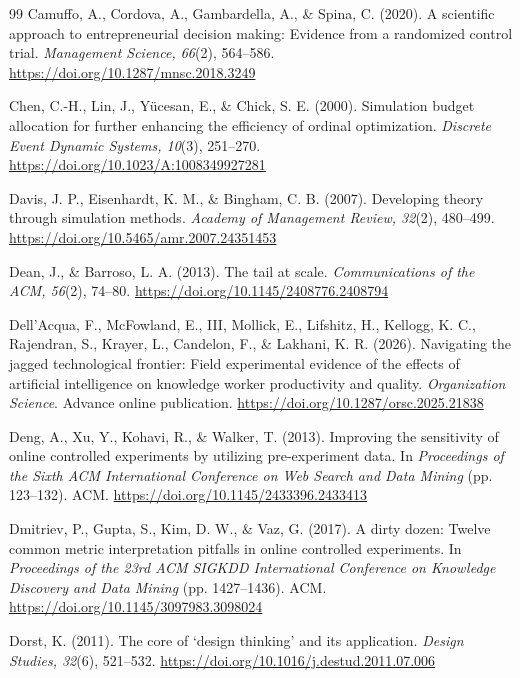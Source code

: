 \documentclass[preprint,12pt,authoryear]{elsarticle}
\providecommand{\doi}[1]{\url{https://doi.org/#1}}
\theoremstyle{definition}
\begin{document}
\begin{thebibliography}{99}
 Camuffo, A., Cordova, A., Gambardella, A., \& Spina, C. (2020). A scientific approach to entrepreneurial decision making: Evidence from a randomized control trial. \textit{Management Science, 66}(2), 564--586. \doi{10.1287/mnsc.2018.3249}

 Chen, C.-H., Lin, J., Y{\"u}cesan, E., \& Chick, S. E. (2000). Simulation budget allocation for further enhancing the efficiency of ordinal optimization. \textit{Discrete Event Dynamic Systems, 10}(3), 251--270. \doi{10.1023/A:1008349927281}

 Davis, J. P., Eisenhardt, K. M., \& Bingham, C. B. (2007). Developing theory through simulation methods. \textit{Academy of Management Review, 32}(2), 480--499. \doi{10.5465/amr.2007.24351453}

 Dean, J., \& Barroso, L. A. (2013). The tail at scale. \textit{Communications of the ACM, 56}(2), 74--80. \doi{10.1145/2408776.2408794}

 Dell'Acqua, F., McFowland, E., III, Mollick, E., Lifshitz, H., Kellogg, K. C., Rajendran, S., Krayer, L., Candelon, F., \& Lakhani, K. R. (2026). Navigating the jagged technological frontier: Field experimental evidence of the effects of artificial intelligence on knowledge worker productivity and quality. \textit{Organization Science}. Advance online publication. \doi{10.1287/orsc.2025.21838}

 Deng, A., Xu, Y., Kohavi, R., \& Walker, T. (2013). Improving the sensitivity of online controlled experiments by utilizing pre-experiment data. In \textit{Proceedings of the Sixth ACM International Conference on Web Search and Data Mining} (pp. 123--132). ACM. \doi{10.1145/2433396.2433413}

 Dmitriev, P., Gupta, S., Kim, D. W., \& Vaz, G. (2017). A dirty dozen: Twelve common metric interpretation pitfalls in online controlled experiments. In \textit{Proceedings of the 23rd ACM SIGKDD International Conference on Knowledge Discovery and Data Mining} (pp. 1427--1436). ACM. \doi{10.1145/3097983.3098024}

 Dorst, K. (2011). The core of `design thinking' and its application. \textit{Design Studies, 32}(6), 521--532. \doi{10.1016/j.destud.2011.07.006}


\end{thebibliography}
\end{document}
